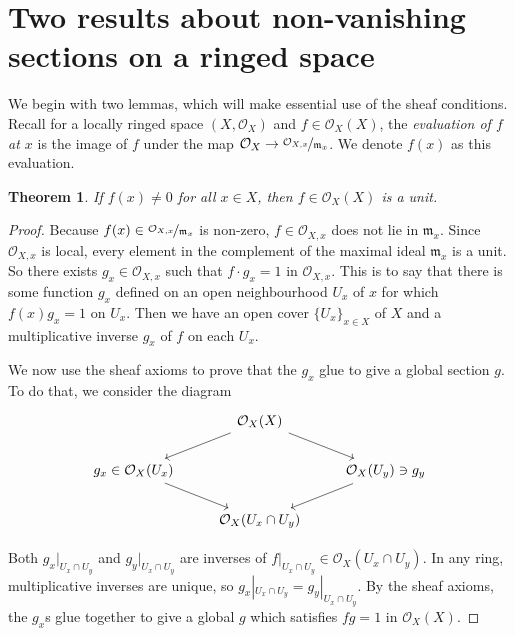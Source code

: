 \documentclass[a4,12pt]{article}
\theoremstyle{definition}
\theoremstyle{remark}
\theoremstyle{plain}
\newtheorem{theorem}{Theorem}[section]
\numberwithin{equation}{section}
\newcommand{\2}[4]{\begin{bmatrix}#1 & #2 \\ #3 & #4 \end{bmatrix}} %
\newcommand{\3}[9]{\begin{bmatrix}#1 & #2 & #3 \\ #4 & #5 & #6 \\ #7 & #8 & #9 \end{bmatrix}} %
\begin{document}
\section{Two results about non-vanishing sections on a ringed space}

We begin with two lemmas, which will make essential use of the sheaf conditions. Recall for a locally ringed space $(X,\mathcal{O}_X)$ and $f \in \mathcal{O}_X(X)$,  the \textit{evaluation of $f$ at $x$} is the image of $f$ under the map $\mathcal{O}_X \to \nicefrac{\mathcal{O}_{X,x}}{\mathfrak{m}_x}$. We denote $f(x)$ as this evaluation.

\begin{theorem}
If $f(x) \ne 0$ for all $x \in X$, then $f \in \mathcal{O}_X(X)$ is a unit. 
\end{theorem}

\begin{proof}
  Because $f(x) \in \nicefrac{\mathcal{O}_{X,x}}{\mathfrak{m}_x}$ is non-zero, \(f \in \mathcal{O}_{X,x}\) does not lie in \(\mathfrak m_x\).
  Since \(\mathcal{O}_{X,x}\) is local, every element in the complement of the maximal ideal \(\mathfrak m_x\) is a unit.
  So there exists \(g_x \in \mathcal{O}_{X,x}\) such that \(f \cdot g_x = 1\) in \(\mathcal{O}_{X,x}\).
  This is to say that there is some function $g_x$ defined on an open neighbourhood $U_x$ of $x$ for which $f(x)g_x = 1$ on \(U_x\). Then we have an open cover $\{U_x\}_{x \in X}$ of $X$ and a multiplicative inverse \(g_x\) of \(f\) on each \(U_x\).

  We now use the sheaf axioms to prove that the \(g_x\) glue to give a global section \(g\).
  To do that, we consider the diagram
\begin{equation}
\begin{tikzcd}
& \mathcal{O}_X(X) \arrow[dl] \arrow[dr] &\\
g_x \in \mathcal{O}_X(U_x) \arrow[dr]&  & \mathcal{O}_X(U_y) \owns g_y\arrow[dl]\\
& \mathcal{O}_X(U_x \cap U_y)&
\end{tikzcd}
\end{equation}

Both $g_x|_{U_{x} \cap U_{y}}$ and $g_y|_{U_{x} \cap U_{y}}$ are inverses of $f|_{U_{x} \cap U_{y}} \in \mathcal{O}_X(U_x \cap U_y)$.
In any ring,  multiplicative inverses are unique, so $g_x|_{U_{x} \cap U_{y}} = g_y|_{U_{x} \cap U_{y}}$. 
By the sheaf axioms, the $g_x$s glue together to give a global $g$ which satisfies $fg = 1$ in $\mathcal{O}_X(X)$.
\end{proof}
\end{document}
